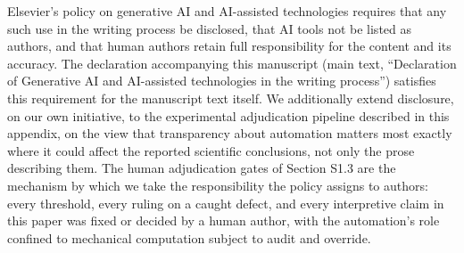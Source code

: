 \documentclass[11pt]{article}
\begin{document}
Elsevier's policy on generative AI and AI-assisted technologies requires that any such use in the writing process be disclosed, that AI tools not be listed as authors, and that human authors retain full responsibility for the content and its accuracy. The declaration accompanying this manuscript (main text, ``Declaration of Generative AI and AI-assisted technologies in the writing process'') satisfies this requirement for the manuscript text itself. We additionally extend disclosure, on our own initiative, to the experimental adjudication pipeline described in this appendix, on the view that transparency about automation matters most exactly where it could affect the reported scientific conclusions, not only the prose describing them. The human adjudication gates of Section S1.3 are the mechanism by which we take the responsibility the policy assigns to authors: every threshold, every ruling on a caught defect, and every interpretive claim in this paper was fixed or decided by a human author, with the automation's role confined to mechanical computation subject to audit and override.
\end{document}
